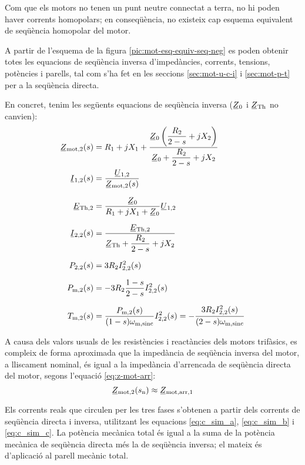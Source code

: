 Com que els motors no tenen un punt neutre connectat a terra, no hi poden haver corrents homopolars; en conseqüència, no existeix cap esquema equivalent de seqüència homopolar del motor.

A partir de l'esquema de la figura \vref{pic:mot-esq-equiv-seq-neg} es poden obtenir totes les equacions de seqüència inversa d'impedàncies, corrents, tensions, potències i parells, tal com s'ha fet en les seccions \ref{sec:mot-u-c-i} i \ref{sec:mot-p-t} per a la seqüència directa. 

En concret, tenim les següents equacions de seqüència inversa ($\cmplx{Z}_0$ i $\cmplx{Z}\ped{Th}$ no canvien):
\begin{align}
	\cmplx{Z}\ped{mot,2}(s) &= R_1 + j X_1 + \frac{\cmplx{Z}_0 \left( \dfrac{R_2}{2-s} + j X_2\right)}{\cmplx{Z}_0 +  \dfrac{R_2}{2-s} + j X_2}\label{eq:mot-Zmot-inv}\\
	\cmplx{I}_{1,2}(s) &= \frac{\cmplx{U}_{1,2}}{\cmplx{Z}\ped{mot,2}(s)}\label{eq:mot-I1-inv}\\[1.5ex]
	\cmplx{E}\ped{Th,2} &= \frac{\cmplx{Z}_0}{R_1 + j X_1 + \cmplx{Z}_0} \cmplx{U}_{1,2}\\[1.5ex]
	\cmplx{I}_{2,2}(s) &= \frac{\cmplx{E}\ped{Th,2}}{\cmplx{Z}\ped{Th} + \dfrac{R_2}{2-s} + j X_2}\\[1.5ex]
	P\ped{2,2}(s) &= 3 R_2 I_{2,2}^2(s)\\[1.5ex]
	P\ped{m,2}(s) &= -3 R_2 \frac{1-s}{2-s}  I_{2,2}^2(s)\\[1.5ex]
	T\ped{m,2}(s) &= \frac{P\ped{m,2}(s)}{(1-s)\omega\ped{m,sinc}} I_{2,2}^2(s) =  - \frac{3 R_2 I_{2,2}^2(s)}{(2-s)\omega\ped{m,sinc}} 
\end{align}


A causa dels valors usuals de les resistències i reactàncies dels motors trifàsics, es compleix de forma aproximada que la impedància de seqüència inversa del motor, a lliscament nominal,  és igual a la impedància d'arrencada de seqüència directa del motor, segons l'equació \eqref{eq:z-mot-arr}:
\begin{equation}
	\cmplx{Z}\ped{mot,2}(s\ped{n}) \approx \cmplx{Z}\ped{mot,arr,1}\label{eq:Zarr-aprox-Z2}
\end{equation}

Els corrents reals que circulen per les tres fases s'obtenen a partir dels corrents de seqüència directa i inversa, utilitzant les equacions \eqref{eq:c_sim_a},
\eqref{eq:c_sim_b} i \eqref{eq:c_sim_c}. La potència mecànica total és igual a la suma de la potència mecànica de seqüència directa més la de 
seqüència inversa; el mateix és d'aplicació al parell mecànic total.


